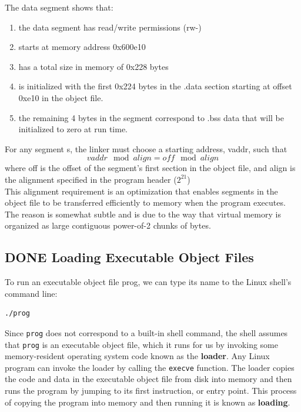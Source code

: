 \documentclass[11pt]{article}
\begin{document}
The data segment shows that:\\
\begin{enumerate}
\item the data segment has read/write permissions (rw-)\\
\item starts at memory address 0x600e10\\
\item has a total size in memory of 0x228 bytes\\
\item is initialized with the first 0x224 bytes in the .data section starting at offset 0xe10 in the object file.\\
\item the remaining 4 bytes in the segment correspond to .bss data that will be initialized to zero at run time.\\
\end{enumerate}



For any segment s, the linker must choose a starting address, vaddr, such that\\
\begin{equation}
vaddr \mod align = off \mod align
\end{equation}
where off is the offset of the segment's first section in the object file, and align is the alignment specified in the program header (\(2^21\))\\

This alignment requirement is an optimization that enables segments in the object file to be transferred efficiently to memory when the program executes. The reason is somewhat subtle and is due to the way that virtual memory is organized as large contiguous power-of-2 chunks of bytes.\\


\subsection{{\bfseries\sffamily DONE} Loading Executable Object Files}
\label{sec:orgc7cf422}
To run an executable object file prog, we can type its name to the Linux shell’s command line:\\
\begin{verbatim}
./prog
\end{verbatim}

Since \texttt{prog} does not correspond to a built-in shell command, the shell assumes that \texttt{prog} is an executable object file, which it runs for us by invoking some memory-resident operating system code known as the \textbf{loader}. Any Linux program can invoke the loader by calling the \texttt{execve} function. The loader copies the code and data in the executable object file from disk into memory and then runs the program by jumping to its first instruction, or entry point. This process of copying the program into memory and then running it is known as \textbf{loading}.\\
\end{document}
